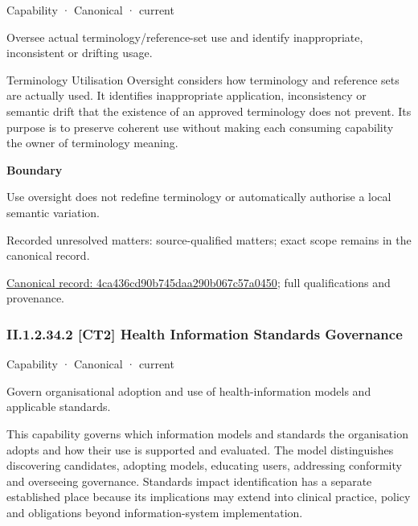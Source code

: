 \label{element:4ca436cd90b745daa290b067c57a0450}
{\small Capability · Canonical · current}\par

Oversee actual terminology/reference-set use and identify inappropriate, inconsistent or drifting usage.



Terminology Utilisation Oversight considers how terminology and reference sets are actually used. It identifies inappropriate application, inconsistency or semantic drift that the existence of an approved terminology does not prevent. Its purpose is to preserve coherent use without making each consuming capability the owner of terminology meaning.



\textbf{Boundary}



Use oversight does not redefine terminology or automatically authorise a local semantic variation.


{\small Recorded unresolved matters: source-qualified matters; exact scope remains in the canonical record.}\par
{\footnotesize \href{../../../../continuum/strategy/capability/4ca436cd90b745daa290b067c57a0450.md}{Canonical record: 4ca436cd90b745daa290b067c57a0450}; full qualifications and provenance.}\par
\subsubsection*{II.1.2.34.2 [CT2] Health Information Standards Governance}
\label{navigation:II.1.2.34.2}

\label{element:b228039d8e764f9b98cb810b68af329d}
{\small Capability · Canonical · current}\par

Govern organisational adoption and use of health-information models and applicable standards.



This capability governs which information models and standards the organisation adopts and how their use is supported and evaluated. The model distinguishes discovering candidates, adopting models, educating users, addressing conformity and overseeing governance. Standards impact identification has a separate established place because its implications may extend into clinical practice, policy and obligations beyond information-system implementation.



